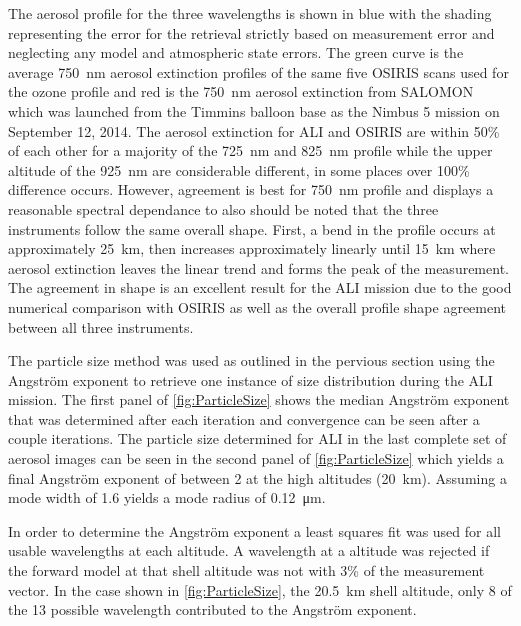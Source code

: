 \documentclass[12pt]{article}
\begin{document}
The aerosol profile for the three wavelengths is shown in blue with the shading representing the error for the retrieval strictly based on measurement error and neglecting any model and atmospheric state errors. The green curve is the average 750~nm aerosol extinction profiles of the same five OSIRIS scans used for the ozone profile and red is the 750~nm aerosol extinction from SALOMON \citep{Berthet2002} which was launched from the Timmins balloon base as the Nimbus 5 mission on September 12, 2014. The aerosol extinction for ALI and OSIRIS are within 50\% of each other for a majority of the 725~nm and 825~nm profile while the upper altitude of the 925~nm are considerable different, in some places over 100\% difference occurs. However, agreement is best for 750~nm profile and displays a reasonable spectral dependance to also should be noted that the three instruments follow the same overall shape.  First, a bend in the profile occurs at approximately 25~km, then increases approximately linearly until 15~km where aerosol extinction leaves the linear trend and forms the peak of the measurement. The agreement in shape is an excellent result for the ALI mission due to the good numerical comparison with OSIRIS as well as the overall profile shape agreement between all three instruments.


The particle size method was used as outlined in the pervious section using the Angstr\"{o}m exponent to retrieve one instance of size distribution during the ALI mission. The first panel of \autoref{fig:ParticleSize} shows the median Angstr\"{o}m exponent that was determined after each iteration and convergence can be seen after a couple iterations. The particle size determined for ALI in the last complete set of aerosol images can be seen in the second panel of \autoref{fig:ParticleSize} which yields a final Angstr\"{o}m exponent of between 2 at the high altitudes (20~km). Assuming a mode width of 1.6 yields a mode radius of 0.12~\si{\micro\metre}.

In order to determine the Angstr\"{o}m exponent a least squares fit was used for all usable wavelengths at each altitude. A wavelength at a altitude was rejected if the forward model at that shell altitude was not with 3\% of the measurement vector. In the case shown in \autoref{fig:ParticleSize}, the 20.5~km shell altitude, only 8 of the 13 possible wavelength contributed to the Angstr\"{o}m exponent.
\end{document}
